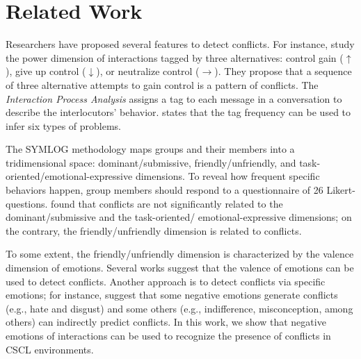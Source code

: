 \documentclass[3p,times,preprint]{elsarticle}
\begin{document}
{\section{Related Work}\label{related}

 \textcolor{coolblack}{Researchers have proposed several features to detect conflicts. } For instance, \cite{Millar1984} study the power dimension of interactions tagged by three alternatives: control gain ($\uparrow$), give up control ($\downarrow$), or neutralize control ($\rightarrow$). They propose that a sequence of three alternative attempts to gain control is a pattern of conflicts.  %
% 
The \textit{Interaction Process Analysis} \citep{Bales1950} assigns a tag to each message in a conversation to describe the interlocutors' behavior. 
\cite{Bales1950} states that the tag frequency can be used to infer six types of problems. %


The SYMLOG methodology \citep{Bales1979}  maps  groups and their members into a tridimensional space: dominant/submissive, friendly/unfriendly, and task-oriented/emotional-expressive dimensions. To reveal how frequent specific behaviors happen,  group members should respond to a questionnaire of 26 Likert-questions. \cite{Wall1986}  found that conflicts are not significantly related to the dominant/submissive and the task-oriented/ emotional-expressive dimensions; on the contrary, the friendly/unfriendly dimension is related to conflicts.

To some extent, the friendly/unfriendly  dimension is characterized by the valence dimension of emotions.  Several works \citep{Lescano2020,Wall1986,Zachary1977,Zakaria2009} suggest that the valence of emotions can be used to detect conflicts. Another approach is to detect conflicts via specific emotions; for instance, \cite{Zakaria2009}  suggest that some  negative emotions generate  conflicts (e.g., hate and disgust) and some others (e.g., indifference, misconception, among others) can indirectly predict conflicts. In this work, we show that   negative emotions of interactions can be used to recognize the presence of conflicts in CSCL environments.


}
\end{document}

